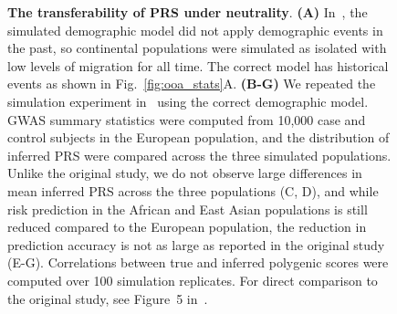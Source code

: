\documentclass{article}
\begin{document}
\begin{figure}[ht]
\begin{center}
\caption{\textbf{The transferability of PRS under neutrality}.
    \textbf{(A)} In~\citet{martin2017human}, the simulated demographic model did not apply demographic
    events in the past, so continental populations were simulated as isolated with low levels of migration
    for all time. The correct model has historical events as shown in Fig.~\ref{fig:ooa_stats}A.
    \textbf{(B-G)} We repeated the simulation experiment in~\cite{martin2017human} using the correct
    demographic model.
    GWAS summary statistics were computed from 10,000 case and control subjects in the European
    population, and the distribution of inferred PRS were compared across the three simulated populations.
    Unlike the original study, we do not observe large differences in mean inferred PRS across
    the three populations (C, D), and while risk prediction in the African and East Asian populations is
    still reduced compared to the European population, the reduction in prediction accuracy is not as
    large as reported in the original study (E-G).
    Correlations between true and inferred polygenic scores were computed over 100 simulation replicates.
    For direct comparison to the original study, see Figure~5 in~\citet{martin2017human}.
}
\label{fig:prs}
\end{center}
\end{figure}
\end{document}
